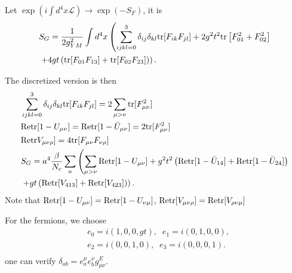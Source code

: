 Let $\exp (i\int d^4 x \mathcal{L}) \to \exp (-S_F)$, it is
\begin{equation}
\begin{split}
&S_G=\frac{1}{2g_{YM}^2}\int d^4x \left(\sum _{ijkl=0}^3 \delta_{ij}\delta_{kl}{\rm tr}[F_{ik}F_{jl}]+2g^2 t^2 {\rm tr}\left[F_{01}^2+F_{02}^2\right]\right.\\
&\left.+4g t\left({\rm tr}[F_{01}F_{13}]+{\rm tr}[F_{02}F_{23}]\right)\right).
\end{split}
\end{equation}

The discretized version is then
\begin{equation}
\begin{split}
&\sum _{ijkl=0}^3 \delta_{ij}\delta_{kl}{\rm tr}[F_{ik}F_{jl}] = 2\sum _{\mu>\nu}{\rm tr}[F_{\mu\nu}^2]\\
&{\rm Retr}[1-U_{\mu\nu}]={\rm Retr}[1-\bar{U}_{\mu\nu}]=2{\rm tr}[F_{\mu\nu}^2]\\
&{\rm Retr}V_{\mu\nu\rho}]=4{\rm tr}[F_{\mu\nu}F_{\nu\rho}]\\
&S_G= a^4 \frac{\beta}{N_c}\sum _n \left(\sum _{\mu>\nu}{\rm Retr}[1-U_{\mu\nu}]+g^2 t^2 \left({\rm Retr}[1-\bar{U}_{14}]+{\rm Retr}[1-\bar{U}_{24}]\right)\right.\\
&\left.+g t\left({\rm Retr}[V_{413}]+{\rm Retr}[V_{423}]\right)\right).\\
\end{split}
\end{equation}
Note that ${\rm Retr}[1-U_{\mu\nu}]={\rm Retr}[1-U_{\nu\mu}]$, ${\rm Retr}[V_{\mu\nu\rho}]={\rm Retr}[V_{\rho\nu\mu}]$

For the fermions, we choose
\begin{equation}
\begin{split}
&e_0=i(1,0,0,g t), \;\; e_1=i(0,1,0,0),\\
&e_2=i(0,0,1,0),\;\; e_3=i(0,0,0,1).\\
\end{split}
\end{equation}
one can verify $\delta _{ab}=e_a^{\mu}e_b^{\nu}g^E_{\mu\nu}$.

